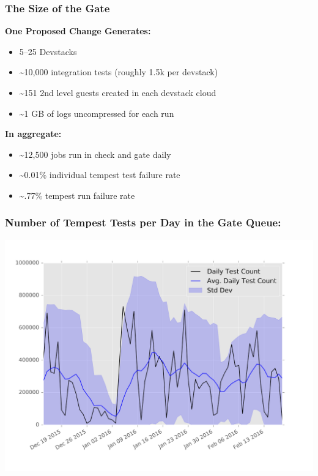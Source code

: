 \documentclass[aspectratio=43,11pt,hyperref={colorlinks=true}]{beamer}
\begin{document}
\begin{frame}
\frametitle{The Size of the Gate}
    \textbf{One Proposed Change Generates:}
      \begin{itemize}
        \item 5--25 Devstacks
        \item \textasciitilde10,000 integration tests (roughly 1.5k per devstack)
        \item \textasciitilde151 2nd level guests created in each devstack cloud
        \item \textasciitilde1 GB of logs uncompressed for each run
      \end{itemize}
      \textbf{In aggregate:}
      \begin{itemize}
        \item \textasciitilde12,500 jobs run in check and gate daily
        \item \textasciitilde0.01\% individual tempest test failure rate
        \item \textasciitilde.77\% tempest run failure rate
      \end{itemize}
\end{frame}

\begin{frame}
      \frametitle{Number of Tempest Tests per Day in the Gate Queue:}
    \begin{center}
      \includegraphics[width=1.0\textwidth]{tempest-gate-count.png}
  \end{center}
\end{frame}
\end{document}
